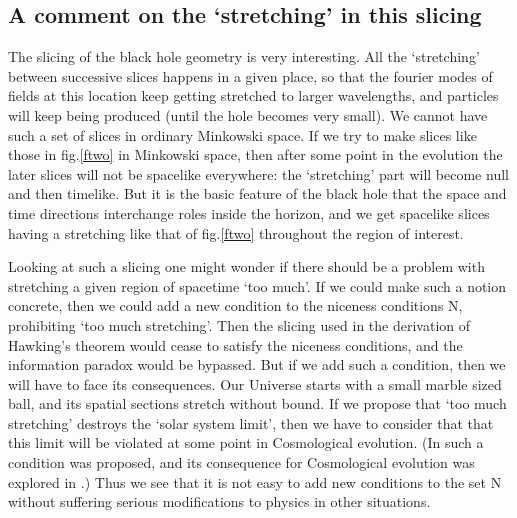 \documentclass[12pt]{article}
\begin{document}
\subsection{A comment on the `stretching' in this slicing}

The slicing of the black hole geometry is very interesting. All the `stretching' between successive slices happens in a given place, so that the  fourier modes of fields at this location keep getting stretched to larger wavelengths, and particles will keep being produced (until the hole becomes very small). We cannot have such a set of slices in ordinary Minkowski space. If we try to make slices like those in fig.\ref{ftwo} in Minkowski space, then after some point in the evolution the later slices will not be spacelike everywhere: the `stretching' part will become null and then timelike. But it is the basic feature of the black hole that the space and time directions interchange roles inside the horizon, and we get spacelike slices having a stretching like that of fig.\ref{ftwo} throughout the region of interest. 


Looking at such a slicing one might wonder if there should be a problem with stretching a given region of spacetime `too much'. If we could make such a notion concrete, then we could add a new condition to the niceness conditions N, prohibiting `too much stretching'. Then  the slicing used in the derivation of Hawking's theorem would cease to satisfy the niceness conditions, and the information paradox would be bypassed. But if we add such a condition, then we will have to face its consequences. Our Universe starts with a small marble sized ball, and its spatial sections stretch without bound. If we propose that `too much stretching' destroys the `solar system limit', then we have to consider that that this limit will be violated at some point in Cosmological evolution. (In \cite{stretch} such a condition was proposed, and its consequence for Cosmological evolution was explored in \cite{cosmo}.)  Thus we see that it is not easy to add new conditions to the set N without suffering serious modifications to physics in other situations. 
\end{document}
